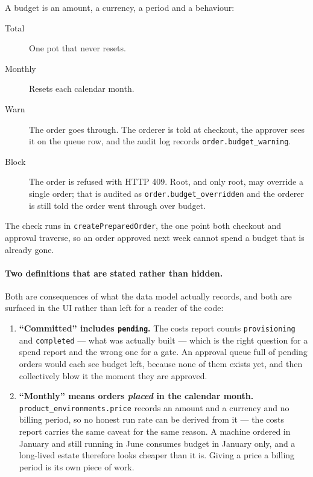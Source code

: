 \documentclass[12pt,a4paper,twoside]{report}
\newcommand{\code}[1]{\texttt{#1}}
\begin{document}
A budget is an amount, a currency, a period and a behaviour:

\begin{description}
  \item[Total] One pot that never resets.
  \item[Monthly] Resets each calendar month.
  \item[Warn] The order goes through. The orderer is told at checkout,
        the approver sees it on the queue row, and the audit log records
        \code{order.budget\_warning}.
  \item[Block] The order is refused with HTTP 409. Root, and only root,
        may override a single order; that is audited as
        \code{order.budget\_overridden} and the orderer is still told the
        order went through over budget.
\end{description}

The check runs in \code{createPreparedOrder}, the one point both checkout
and approval traverse, so an order approved next week cannot spend a
budget that is already gone.

\paragraph{Two definitions that are stated rather than hidden.}
Both are consequences of what the data model actually records, and both
are surfaced in the UI rather than left for a reader of the code:

\begin{enumerate}
  \item \textbf{``Committed'' includes \code{pending}.} The costs report
        counts \code{provisioning} and \code{completed} --- what was
        actually built --- which is the right question for a spend report
        and the wrong one for a gate. An approval queue full of pending
        orders would each see budget left, because none of them exists
        yet, and then collectively blow it the moment they are approved.
  \item \textbf{``Monthly'' means orders \emph{placed} in the calendar
        month.} \code{product\_environments.price} records an amount and
        a currency and no billing period, so no honest run rate can be
        derived from it --- the costs report carries the same caveat for
        the same reason. A machine ordered in January
        and still running in June consumes budget in January only, and a
        long-lived estate therefore looks cheaper than it is. Giving a
        price a billing period is its own piece of work.
\end{enumerate}
\end{document}
